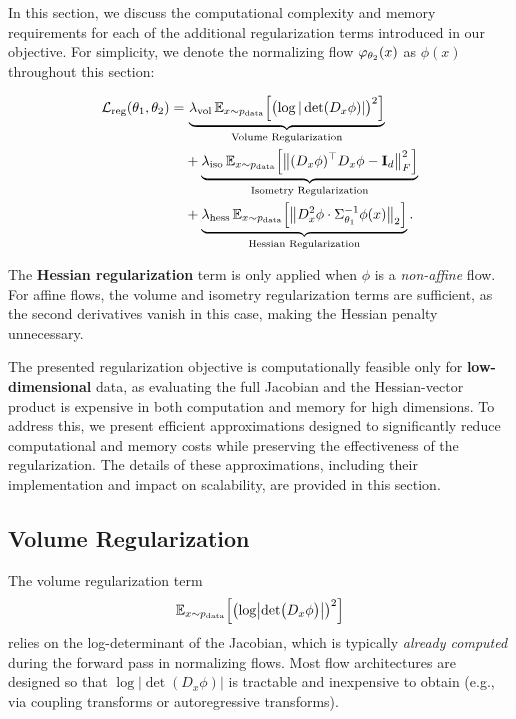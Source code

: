 In this section, we discuss the computational complexity and memory requirements for each of the additional regularization terms introduced in our objective. For simplicity, we denote the normalizing flow \(\varphi_{\theta_2}(x)\) as \(\phi(x)\) throughout this section:

\begin{align*}
\mathcal{L}_{\text{reg}}(\theta_1, \theta_2) 
= & \, \underbrace{
\lambda_{\text{vol}} 
\, \mathbb{E}_{x \sim p_{\text{data}}}\Bigl[
   \bigl(\log | \det (D_x \phi) | \bigr)^2
\Bigr]
}_{\text{Volume Regularization}} \\
& + \underbrace{
\lambda_{\text{iso}} 
\, \mathbb{E}_{x \sim p_{\text{data}}}\Bigl[
   \bigl\| (D_x \phi)^\top D_x \phi 
   - \mathbf{I}_d \bigr\|_F^2
\Bigr]
}_{\text{Isometry Regularization}} \\
& + \underbrace{
\lambda_{\text{hess}} 
\, \mathbb{E}_{x \sim p_{\text{data}}}\Bigl[
   \bigl\| D^2_x \phi 
   \cdot \Sigma_{\theta_1}^{-1} \phi(x) \bigr\|_2
\Bigr]
}_{\text{Hessian Regularization}}.
\end{align*}

The \textbf{Hessian regularization} term is only applied when \(\phi\) is a \textit{non-affine} flow. For affine flows, the volume and isometry regularization terms are sufficient, as the second derivatives vanish in this case, making the Hessian penalty unnecessary.

The presented regularization objective is computationally feasible only for \textbf{low-dimensional} data, as evaluating the full Jacobian and the Hessian-vector product is expensive in both computation and memory for high dimensions. To address this, we present efficient approximations designed to significantly reduce computational and memory costs while preserving the effectiveness of the regularization. The details of these approximations, including their implementation and impact on scalability, are provided in this section.

\subsection{Volume Regularization}

The volume regularization term
\[
\mathbb{E}_{x \sim p_{\text{data}}} \Bigl[ \bigl(\log \bigl|\det \bigl(D_x \phi \bigr)\bigr|\bigr)^2 \Bigr]
\]
relies on the log-determinant of the Jacobian, which is typically \textit{already computed} during the forward pass in normalizing flows. Most flow architectures are designed so that \(\log|\det(D_x \phi)|\) is tractable and inexpensive to obtain (e.g., via coupling transforms or autoregressive transforms). 

